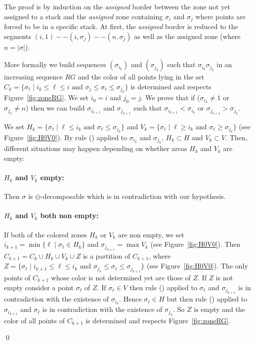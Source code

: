 \documentclass[11pt]{article}
\newenvironment{pf}{{\em \noindent Proof:}}{ \hfill \qed\smallskip}
\newcommand{\rmnum}[1]{\romannumeral #1}
\newcommand{\ascentRG}{increasing sequence $RG$\xspace}
\begin{document}
\begin{pf}
The proof is by induction on the {\em assigned} border between the zone not yet assigned to a stack and the {\em assigned} zone containing $\sigma_i$ and $\sigma_j$ where points are 
forced to be in a specific stack. 
At first, the {\em assigned} border is reduced to the segments $(i,1) -- (i,\sigma_j) -- (n,\sigma_j)$ as well as the assigned zone (where $n=|\sigma|$).

More formally we build sequences $(\sigma_{i_k})$ and $(\sigma_{j_k})$ such that $\sigma_{i_k} \sigma_{j_k}$ in an \ascentRG and the color of all points lying in the set $C_k = \{ \sigma_\ell \mid i_k \leq \ell \leq i \text{ and } \sigma_j \leq \sigma_\ell \leq \sigma_{j_k} \}$ is determined and respects Figure~\ref{fig:zoneRG}.
We set $i_0 = i$ and $j_0 = j$.
We prove that if ($\sigma_{i_k} \neq 1$ or $\sigma_{j_k} \neq n$) then we can build $\sigma_{i_{k+1}}$ and $\sigma_{j_{k+1}}$ such that $\sigma_{i_{k+1}} < \sigma_{i_k}$ or $\sigma_{j_{k+1}} > \sigma_{j_k}$.

We set $H_k = \{ \sigma_\ell \mid \ell \leq i_k \text{ and } \sigma_\ell \leq \sigma_{j_k} \}$ and $V_k = \{ \sigma_\ell \mid \ell \geq i_k \text{ and } \sigma_\ell \geq \sigma_{j_k} \}$ (see Figure~\ref{fig:H0V0}). 
By rule (\rmnum{3}) applied to $\sigma_{i_k}$ and $\sigma_{j_k}$, $H_k \subset H$ and $V_k \subset V$. 
Then, different situations may happen depending on whether areas $H_k$ and $V_k$ are empty:

\paragraph{$H_k$ and $V_k$ empty:} Then $\sigma$ is $\ominus$-decomposable which is in contradiction with our hypothesis.

\paragraph{$H_k$ and $V_k$ both non empty:} If both of the colored zones $H_k$ or $V_k$ are non empty, we set $i_{k+1} = \min \{ \ell \mid \sigma_\ell \in H_k \}$ and $\sigma_{j_{k+1}} = \max V_k$ (see Figure~\ref{fig:H0V0}). 
Then $C_{k+1} = C_k \cup H_k \cup V_k \cup Z$ is a partition of $C_{k+1}$, where $Z = \{ \sigma_\ell \mid i_{k+1} \leq \ell \leq i_k \text{ and } \sigma_{j_k} \leq \sigma_\ell \leq \sigma_{j_{k+1}} \}$ (see Figure~\ref{fig:H0V0}). 
The only points of $C_{k+1}$ whose color is not determined yet are those of $Z$. 
If $Z$ is not empty consider a point $\sigma_\ell$ of $Z$. 
If $\sigma_\ell \in V$ then rule (\rmnum{1}) applied to $\sigma_\ell$ and $\sigma_{j_{k+1}}$ is in contradiction with the existence of $\sigma_{i_k}$. 
Hence $\sigma_\ell \in H$ but then rule (\rmnum{2}) applied to $\sigma_{i_{k+1}}$ and $\sigma_\ell$ is in contradiction with the existence of $\sigma_{j_k}$. 
So $Z$ is empty and the color of all points of $C_{k+1}$ is determined and respects Figure~\ref{fig:zoneRG}.


\end{pf}
\end{document}
